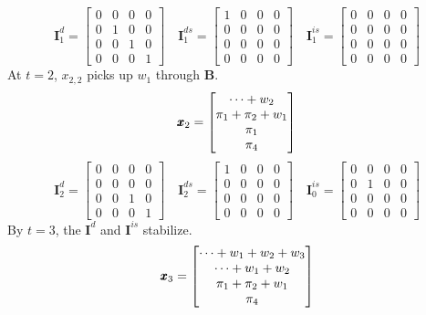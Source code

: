 \documentclass[]{article}
\def\UPS{\mbox{\boldmath $\Upsilon$}}
\def\BB{\mbox{$\mathbf B$}}	\def\bb{\mbox{$\mathbf b$}} \def\Bb{\mbox{$\mathbf J$}} \def\Ba{\mbox{$\mathbf L$}} \def\Bm{\UPS}
\def\II{\mbox{$\mathbf I$}} \def\ii{\mbox{$\mathbf i$}}
\begin{document}
\begin{equation}
\II_1^d=\begin{bmatrix}
0&0&0&0\\
0&1&0&0\\
0&0&1&0\\
0&0&0&1
\end{bmatrix}
\quad
\II_1^{ds}=\begin{bmatrix}
1&0&0&0\\
0&0&0&0\\
0&0&0&0\\
0&0&0&0
\end{bmatrix}
\quad
\II_1^{is}=\begin{bmatrix}
0&0&0&0\\
0&0&0&0\\
0&0&0&0\\
0&0&0&0
\end{bmatrix}
\end{equation}
At $t=2$, $x_{2,2}$ picks up $w_1$ through $\BB$.
\begin{equation}
\mbox{$\pmb{x}$}_2=\begin{bmatrix}
\dots+w_2\\
\pi_1+\pi_2+w_1\\
\pi_1\\
\pi_4
\end{bmatrix}
\end{equation}
\begin{equation}
\II_2^d=\begin{bmatrix}
0&0&0&0\\
0&0&0&0\\
0&0&1&0\\
0&0&0&1
\end{bmatrix}
\quad
\II_2^{ds}=\begin{bmatrix}
1&0&0&0\\
0&0&0&0\\
0&0&0&0\\
0&0&0&0
\end{bmatrix}
\quad
\II_0^{is}=\begin{bmatrix}
0&0&0&0\\
0&1&0&0\\
0&0&0&0\\
0&0&0&0
\end{bmatrix}
\end{equation}
By $t=3$, the $\II^{d}$ and $\II^{is}$ stabilize.
\begin{equation}
\mbox{$\pmb{x}$}_3=\begin{bmatrix}
\dots+w_1+w_2+w_3\\
\dots+w_1+w_2\\
\pi_1+\pi_2+w_1\\
\pi_4
\end{bmatrix}
\end{equation}
\end{document}
